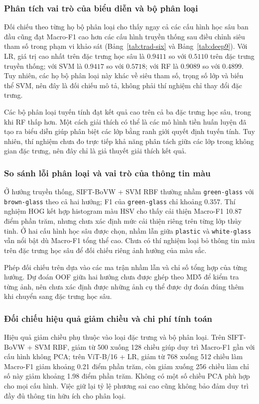 \subsubsection{Phân tích vai trò của biểu diễn và bộ phân loại}
Đối chiếu theo từng họ bộ phân loại cho thấy ngay cả các cấu hình học sâu ban đầu cũng đạt Macro-F1 cao hơn các cấu hình truyền thống sau điều chỉnh siêu tham số trong phạm vi khảo sát (Bảng~\ref{tab:trad-six} và Bảng~\ref{tab:deep9}). Với LR, giá trị cao nhất trên đặc trưng học sâu là $0.9411$ so với $0.5110$ trên đặc trưng truyền thống; với SVM là $0.9417$ so với $0.5718$; với RF là $0.9089$ so với $0.4899$. Tuy nhiên, các họ bộ phân loại này khác về siêu tham số, trọng số lớp và biến thể SVM, nên đây là đối chiếu mô tả, không phải thí nghiệm chỉ thay đổi đặc trưng.

Các bộ phân loại tuyến tính đạt kết quả cao trên cả ba đặc trưng học sâu, trong khi RF thấp hơn. Một cách giải thích có thể là các mô hình tiền huấn luyện đã tạo ra biểu diễn giúp phân biệt các lớp bằng ranh giới quyết định tuyến tính. Tuy nhiên, thí nghiệm chưa đo trực tiếp khả năng phân tách giữa các lớp trong không gian đặc trưng, nên đây chỉ là giả thuyết giải thích kết quả.

\subsubsection{So sánh lỗi phân loại và vai trò của thông tin màu}
Ở hướng truyền thống, SIFT-BoVW + SVM RBF thường nhầm \texttt{green-glass} với \texttt{brown-glass} theo cả hai hướng; F1 của \texttt{green-glass} chỉ khoảng $0.357$. Thí nghiệm HOG kết hợp histogram màu HSV cho thấy cải thiện Macro-F1 10.87 điểm phần trăm, nhưng chưa xác định mức cải thiện riêng trên từng lớp thủy tinh. Ở hai cấu hình học sâu được chọn, nhầm lẫn giữa \texttt{plastic} và \texttt{white-glass} vẫn nổi bật dù Macro-F1 tổng thể cao. Chưa có thí nghiệm loại bỏ thông tin màu trên đặc trưng học sâu để đối chiếu riêng ảnh hưởng của màu sắc.

Phép đối chiếu trên dựa vào các ma trận nhầm lẫn và chỉ số tổng hợp của từng hướng. Dự đoán OOF giữa hai hướng chưa được ghép theo MD5 để kiểm tra từng ảnh, nên chưa xác định được những ảnh cụ thể được dự đoán đúng thêm khi chuyển sang đặc trưng học sâu.

\subsubsection{Đối chiếu hiệu quả giảm chiều và chi phí tính toán}
Hiệu quả giảm chiều phụ thuộc vào loại đặc trưng và bộ phân loại. Trên SIFT-BoVW + SVM RBF, giảm từ 500 xuống 128 chiều giúp duy trì Macro-F1 gần với cấu hình không PCA; trên ViT-B/16 + LR, giảm từ 768 xuống 512 chiều làm Macro-F1 giảm khoảng 0.21 điểm phần trăm, còn giảm xuống 256 chiều làm chỉ số này giảm khoảng 1.98 điểm phần trăm. Không có một số chiều PCA phù hợp cho mọi cấu hình. Việc giữ lại tỷ lệ phương sai cao cũng không bảo đảm duy trì đầy đủ thông tin hữu ích cho phân loại.

